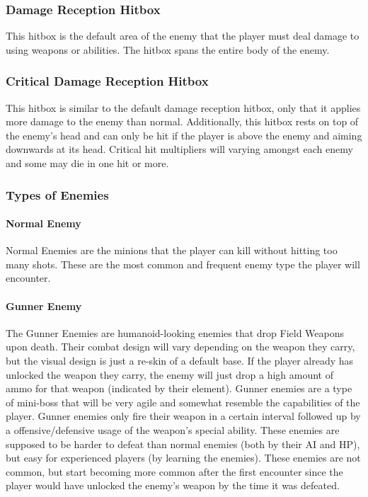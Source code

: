 \documentclass[12pt]{article}
\begin{document}
\subsubsection{Damage Reception Hitbox}

This hitbox is the default area of the enemy that the player must deal damage to using weapons or abilities. The hitbox spans the entire body of the enemy.

\subsubsection{Critical Damage Reception Hitbox}

This hitbox is similar to the default damage reception hitbox, only that it applies more damage to the enemy than normal. Additionally, this hitbox rests on top of the enemy's head and can only be hit if the player is above the enemy and aiming downwards at its head. Critical hit multipliers will varying amongst each enemy and some may die in one hit or more. 

\subsubsection{Types of Enemies}

\paragraph{Normal Enemy}

Normal Enemies are the minions that the player can kill without hitting too many shots. These are the most common and frequent enemy type the player will encounter. 

\paragraph{Gunner Enemy}

The Gunner Enemies are humanoid-looking enemies that drop Field Weapons upon death. Their combat design will vary depending on the weapon they carry, but the visual design is just a re-skin of a default base. If the player already has unlocked the weapon they carry, the enemy will just drop a high amount of ammo for that weapon (indicated by their element). Gunner enemies are a type of mini-boss that will be very agile and somewhat resemble the capabilities of the player. Gunner enemies only fire their weapon in a certain interval followed up by a offensive/defensive usage of the weapon's special ability. These enemies are supposed to be harder to defeat than normal enemies (both by their AI and HP), but easy for experienced players (by learning the enemies). These enemies are not common, but start becoming more common after the first encounter since the player would have unlocked the enemy's weapon by the time it was defeated. 
\end{document}
